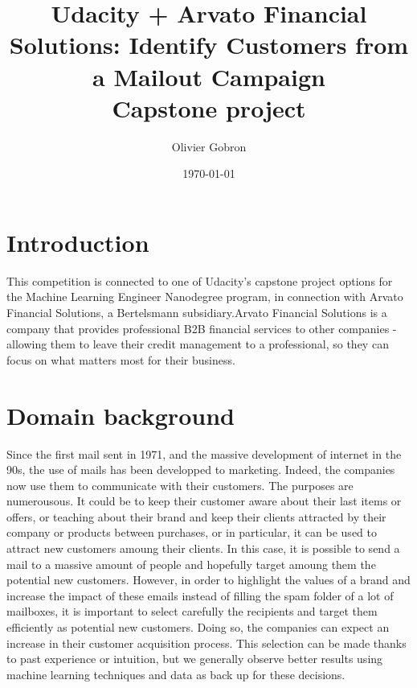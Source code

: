 \documentclass[12pt]{article}
\begin{document}
\title{%
  Udacity + Arvato Financial Solutions: Identify Customers from a Mailout Campaign \\
  \large Capstone project}
\author{Olivier Gobron}
\date{\today}


\maketitle


\section{Introduction}

This competition \cite{kaggle_competiton} is connected to one of Udacity's capstone project options for the Machine Learning Engineer Nanodegree program, in connection with Arvato Financial Solutions, a Bertelsmann subsidiary.Arvato Financial Solutions is a company that provides professional B2B financial services to other companies - allowing them to leave their credit management to a professional, so they can focus on what matters most for their business.

\section{Domain background}

Since the first mail sent in 1971, and the massive development of internet in the 90s, the use of mails has been developped to marketing. Indeed, the companies now use them to communicate with their customers. The purposes are numerousous. It could be to keep their customer aware about their last items or offers, or teaching about their brand and keep their clients attracted by their company or products between purchases, or in particular, it can be used to attract new customers amoung their clients. In this case, it is possible to send a mail to a massive amount of people and hopefully target amoung them the potential new customers. However, in order to highlight the values of a brand and increase the impact of these emails instead of filling the spam folder of a lot of mailboxes, it is important to select carefully the recipients and target them efficiently as potential new customers. Doing so, the companies can expect an increase in their customer acquisition process. This selection can be made thanks to past experience or intuition, but we generally observe better results using machine learning techniques and data as back up for these decisions. \\
\end{document}
